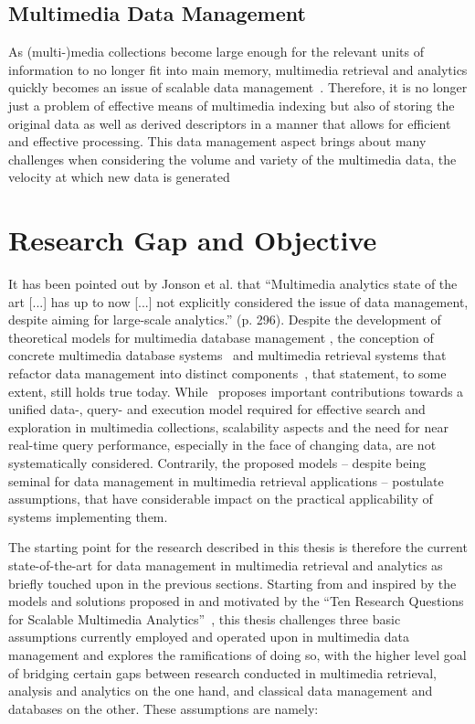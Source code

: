 \subsection{Multimedia Data Management}

As (multi-)media collections become large enough for the relevant units of information to no longer fit into main memory, multimedia retrieval and analytics quickly becomes an issue of scalable data management~\cite{Jonson:2016,Pouyanfar:2018}. Therefore, it is no longer just a problem of effective means of multimedia indexing but also of storing the original data as well as derived descriptors in a manner that allows for efficient and effective processing. This data management aspect brings about many challenges when considering the volume and variety of the multimedia data, the velocity at which new data is generated

\section{Research Gap and Objective}
\label{section:research_gap}

It has been pointed out by Jonson et al. that ``Multimedia analytics state of the art [...] has up to now [...] not explicitly considered the issue of data management, despite aiming for large-scale analytics.'' \cite{Jonson:2016} (p. 296). Despite the development of theoretical models for multimedia database management \cite{Adjeroh:1997Multimedia}, the conception of concrete multimedia database systems~\cite{Luc:2008LIRE,Giangreco:2016adam,Wang:2021Milvus} and multimedia retrieval systems that refactor data management into distinct components~\cite{Rossetto:2016vitrivr,Gasser:2019Multimodal}, that statement, to some extent, still holds true today. While~\cite{Giangreco:2018Database} proposes important contributions towards a unified data-, query- and execution model required for effective search and exploration in multimedia collections, scalability aspects and the need for near real-time query performance, especially in the face of changing data, are not systematically considered. Contrarily, the proposed models -- despite being seminal for data management in multimedia retrieval applications -- postulate assumptions, that have considerable impact on the practical applicability of systems implementing them.

The starting point for the research described in this thesis is therefore the current state-of-the-art for data management in multimedia retrieval and analytics as briefly touched upon in the previous sections. Starting from and inspired by the models and solutions proposed in \cite{Giangreco:2016adam,Giangreco:2018Database} and motivated by the ``Ten Research Questions for Scalable Multimedia Analytics''~\cite{Jonson:2016}, this thesis challenges three basic assumptions currently employed and operated upon in multimedia data management and explores the ramifications of doing so, with the higher level goal of bridging certain gaps between research conducted in multimedia retrieval, analysis and analytics on the one hand, and classical data management and databases on the other. These assumptions are namely:

